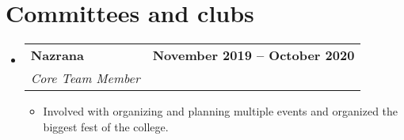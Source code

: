 \documentclass[letterpaper,11pt]{article}
\makeatletter
\newcommand{\resumeItem}[1]{
  \item\small{
    {#1 \vspace{-2pt}}
  }
}
\newcommand{\resumeSubheading}[4]{
  \vspace{-2pt}\item
    \begin{tabular*}{1.0\textwidth}[t]{l@{\extracolsep{\fill}}r}
      \vspace{-2pt}\textbf{#1} & \textbf{\small #2} \\
      \textit{\small#3} & \textit{\small #4} \\
    \end{tabular*}\vspace{-7pt}
}
\newcommand{\resumeSubHeadingListStart}{\begin{itemize}[leftmargin=0.0in, label={}]}
\newcommand{\resumeSubHeadingListEnd}{\end{itemize}}
\newcommand{\resumeItemListStart}{\begin{itemize}}
\newcommand{\resumeItemListEnd}{\end{itemize}\vspace{-5pt}}
\makeatother
\begin{document}
\vspace{-8pt}

\section{Committees and clubs}
    \vspace{-2pt}
    \resumeSubHeadingListStart
        \resumeSubheading
            {Nazrana}{November 2019 -- October 2020}
            {Core Team Member}{}
            \vspace{-7pt}
            \resumeItemListStart
                \resumeItem{Involved with organizing and planning multiple  events and organized the biggest fest of the college.}
            \resumeItemListEnd
            \vspace{-4pt}

    \resumeSubHeadingListEnd
\vspace{-8pt}
\end{document}
